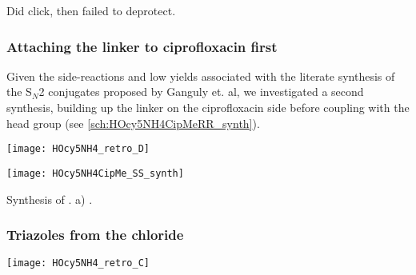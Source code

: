 Did click, then failed to deprotect.

\subsubsection{Attaching the linker to ciprofloxacin first}

Given the side-reactions and low yields associated with the literate synthesis of the S$_N$2 conjugates proposed by Ganguly et. al\cite{Ganguly2011}, we investigated a second synthesis, building up the linker on the ciprofloxacin side before coupling with the head group (see \ref{sch:HOcy5NH4CipMeRR_synth}).

\begin{scheme}[H]
	\begin{center}
		\texttt{[image: HOcy5NH4\_retro\_D]}
		\caption{\label{sch:HOcy5NH4_retro_D}}
	\end{center}
\end{scheme}


\begin{scheme}[H]
	\begin{center}
		\texttt{[image: HOcy5NH4CipMe\_SS\_synth]}
		\caption{Synthesis of . 
			a) . 
			\label{sch:HOcy5NH4CipMe_SS_synth}}
	\end{center}
\end{scheme}



\subsubsection{Triazoles from the chloride}

\begin{scheme}[H]
	\begin{center}
		\texttt{[image: HOcy5NH4\_retro\_C]}
		\caption{\label{sch:HOcy5NH4_retro_C}}
	\end{center}
\end{scheme}

